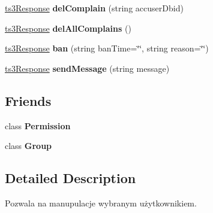 \begin{DoxyCompactItemize}
\item 
\hyperlink{struct_ts3_api_1_1ts3_response}{ts3\+Response} {\bfseries del\+Complain} (string accuser\+Dbid)\hypertarget{class_ts3_api_1_1_client_a99223aa38b6c0ef75539c701b6a62d88}{}\label{class_ts3_api_1_1_client_a99223aa38b6c0ef75539c701b6a62d88}

\item 
\hyperlink{struct_ts3_api_1_1ts3_response}{ts3\+Response} {\bfseries del\+All\+Complains} ()\hypertarget{class_ts3_api_1_1_client_ac068b0295c2f83931cfc353cc42236ec}{}\label{class_ts3_api_1_1_client_ac068b0295c2f83931cfc353cc42236ec}

\item 
\hyperlink{struct_ts3_api_1_1ts3_response}{ts3\+Response} {\bfseries ban} (string ban\+Time=\char`\"{}\char`\"{}, string reason=\char`\"{}\char`\"{})\hypertarget{class_ts3_api_1_1_client_a41e103e4201cade9384d9e2d19f9f1e5}{}\label{class_ts3_api_1_1_client_a41e103e4201cade9384d9e2d19f9f1e5}

\item 
\hyperlink{struct_ts3_api_1_1ts3_response}{ts3\+Response} {\bfseries send\+Message} (string message)\hypertarget{class_ts3_api_1_1_client_a5ca6d7dcf16e56d5984dfd1782deea95}{}\label{class_ts3_api_1_1_client_a5ca6d7dcf16e56d5984dfd1782deea95}

\end{DoxyCompactItemize}
\subsection*{Friends}
\begin{DoxyCompactItemize}
\item 
class {\bfseries Permission}\hypertarget{class_ts3_api_1_1_client_ad3834bbd6b2c4839e7f69dc4cc1d6ae6}{}\label{class_ts3_api_1_1_client_ad3834bbd6b2c4839e7f69dc4cc1d6ae6}

\item 
class {\bfseries Group}\hypertarget{class_ts3_api_1_1_client_a2697825715974a353728f0d4d5658112}{}\label{class_ts3_api_1_1_client_a2697825715974a353728f0d4d5658112}

\end{DoxyCompactItemize}


\subsection{Detailed Description}
Pozwala na manupulacje wybranym użytkownikiem. 




